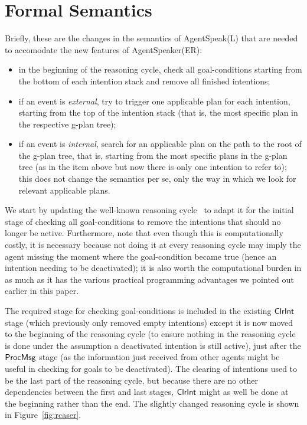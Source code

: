 \section{Formal Semantics}
\label{sec:formalisation}


Briefly, these are the changes in the semantics of AgentSpeak(L)
that are needed to accomodate the new features of AgentSpeaker(ER):

\begin{itemize}
\item in the beginning of the reasoning cycle, check all
  goal-conditions starting from the bottom of each intention stack and
  remove all finished intentions;

\item if an event is \emph{external}, try to trigger one
  applicable plan for each intention, starting from the
  top of the intention stack (that is, the most specific plan in the
  respective g-plan tree);

\item if an event is \emph{internal}, search for an applicable plan on
  the path to the root of the g-plan tree, that is, starting from the
  most specific plans in the g-plan tree (as in the item above but now
  there is only one intention to refer to); this does not change the
  semantics per se, only the way in which we look for relevant
  applicable plans.
\end{itemize}

We start by updating the well-known reasoning cycle~\cite{JasonBook}
to adapt it for the initial stage of checking all goal-conditions to
remove the intentions that should no longer be active. Furthermore,
note that even though this is computationally costly, it is necessary
because not doing it at every reasoning cycle may imply the agent
missing the moment where the goal-condition became true (hence an
intention needing to be deactivated); it is also worth the
computational burden in as much as it has the various practical
programming advantages we pointed out earlier in this paper.


The required stage for checking goal-conditions is included in the
existing $\mathsf{ClrInt}$ stage (which previously only removed empty
intentions) except it is now moved to the beginning of the reasoning
cycle (to ensure nothing in the reasoning cycle is done under the
assumption a deactivated intention is still active), just after the
$\mathsf{ProcMsg}$ stage (as the information just received from other agents
might be useful in checking for goals to be deactivated). The clearing of
intentions used to be the last part of the reasoning cycle, but
because there are no other dependencies between the first and last
stages, $\mathsf{ClrInt}$ might as well be done at the beginning rather than
the end. The slightly changed reasoning cycle is shown in
Figure~\ref{fig:rcaser}.

